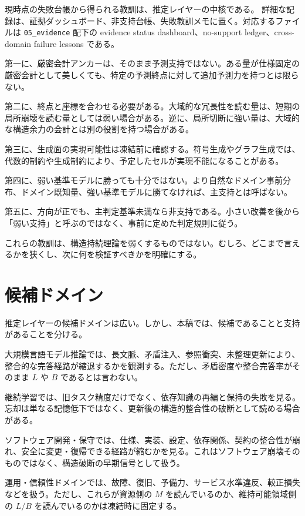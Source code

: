 \documentclass[12pt,a4paper]{article}
\begin{document}
現時点の失敗台帳から得られる教訓は、推定レイヤーの中核である。 詳細な記録は、証拠ダッシュボード、非支持台帳、失敗教訓メモに置く。対応するファイルは \texttt{05\_evidence} 配下の evidence status dashboard、no-support ledger、cross-domain failure lessons である。

第一に、厳密会計アンカーは、そのまま予測支持ではない。ある量が仕様固定の厳密会計として美しくても、特定の予測終点に対して追加予測力を持つとは限らない。

第二に、終点と座標を合わせる必要がある。大域的な冗長性を読む量は、短期の局所崩壊を読む量としては弱い場合がある。逆に、局所切断に強い量は、大域的な構造余力の会計とは別の役割を持つ場合がある。

第三に、生成面の実現可能性は凍結前に確認する。符号生成やグラフ生成では、代数的制約や生成制約により、予定したセルが実現不能になることがある。

第四に、弱い基準モデルに勝っても十分ではない。より自然なドメイン事前分布、ドメイン既知量、強い基準モデルに勝てなければ、主支持とは呼ばない。

第五に、方向が正でも、主判定基準未満なら非支持である。小さい改善を後から「弱い支持」と呼ぶのではなく、事前に定めた判定規則に従う。

これらの教訓は、構造持続理論を弱くするものではない。むしろ、どこまで言えるかを狭くし、次に何を検証すべきかを明確にする。

\section{候補ドメイン}\label{ux5019ux88dcux30c9ux30e1ux30a4ux30f3}

推定レイヤーの候補ドメインは広い。しかし、本稿では、候補であることと支持があることを分ける。

大規模言語モデル推論では、長文脈、矛盾注入、参照衝突、未整理更新により、整合的な完答経路が縮退するかを観測する。ただし、矛盾密度や整合完答率がそのまま \(L\) や \(B\) であるとは言わない。

継続学習では、旧タスク精度だけでなく、依存知識の再編と保持の失敗を見る。忘却は単なる記憶低下ではなく、更新後の構造的整合性の破断として読める場合がある。

ソフトウェア開発・保守では、仕様、実装、設定、依存関係、契約の整合性が崩れ、安全に変更・復帰できる経路が縮むかを見る。これはソフトウェア崩壊そのものではなく、構造破断の早期信号として扱う。

運用・信頼性ドメインでは、故障、復旧、予備力、サービス水準違反、較正損失などを扱う。ただし、これらが資源側の \(M\) を読んでいるのか、維持可能領域側の \(L/B\) を読んでいるのかは凍結時に固定する。
\end{document}
